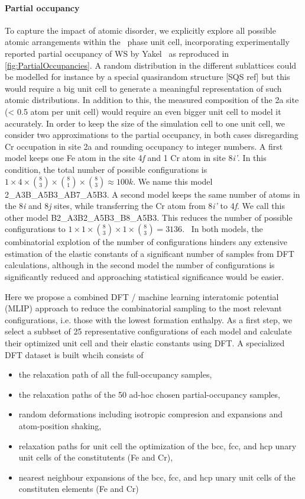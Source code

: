 \documentclass[superscriptaddress, 12pt]{revtex4-2}%
\begin{document}
\paragraph{Partial occupancy} To capture the impact of atomic disorder, we explicitly explore all possible atomic arrangements within the \textsigma~phase unit cell, incorporating experimentally reported partial occupancy of WS by Yakel~\cite{yakel_atom_1983} as reproduced in \autoref{fig:PartialOccupancies}.  
A random distribution in the different sublattices could be modelled for instance by a special quasirandom structure [SQS ref] but  this would require a big unit cell to generate a meaningful representation of such atomic distributions. 
In addition to this, the measured composition of the 2a site (< 0.5 atom per unit cell) would require an even bigger unit cell to model it accurately.
In order to keep the size of the simulation cell to one unit cell, we consider two approximations to the partial occupancy, in both cases disregarding Cr occupation in site 2a and rounding occupancy to integer numbers.  
A first model keeps one Fe atom in the site 4\textit{f} and 1 Cr atom in site 8\textit{i'}.  
In this condition, the total number of possible configurations is $ 1 \times 4 \times \binom{8}{3}\times \binom{8}{1} \times \binom{8}{3} \approx 100k $. 
We name this model 2\_A3B\_A5B3\_AB7\_A5B3.
A second model keeps the same number of atoms in the 8\textit{i} and 8\textit{j} sites, while transferring the Cr atom from 8\textit{i'} to 4\textit{f}.  
We call this other model B2\_A3B2\_A5B3\_B8\_A5B3. 
This reduces the number of possible configurations to $1 \times 1 \times \binom{8}{3}\times 1\times\binom {8}{3} = 3136$.~
In both models, the combinatorial explotion of the number of configurations hinders any extensive estimation of the elastic constants of a significant number of samples from DFT calculations, although in the second model the number of configurations is significantly reduced and approaching statistical significance would be easier.

Here we propose a combined DFT / machine learning interatomic potential (MLIP) approach to reduce the combinatorial sampling to the most relevant configurations, i.e. those with the lowest formation enthalpy.
As a first step, we select a subbset of 25 representative configurations of each model and calculate their optimized unit cell and their elastic constants using DFT. 
A specialized DFT dataset is built whcih consists of 
\begin{itemize}
	\item the relaxation path of all the full-occupancy samples,
	\item the relaxation paths of the 50 ad-hoc chosen partial-occupancy samples,
	\item random deformations including isotropic compresion and expansions and atom-position shaking, 
	\item relaxation paths for unit cell the optimization of the bcc, fcc, and hcp unary unit cells of the constitutents (Fe and Cr), 
	\item nearest neighbour expansions of the bcc, fcc, and hcp unary unit cells of the constituten elements (Fe and Cr)
\end{itemize}
\end{document}
